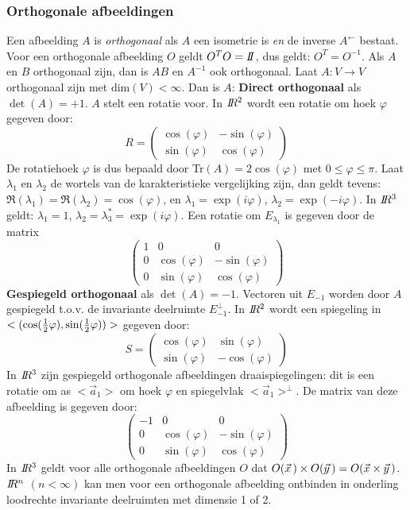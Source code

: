 \documentclass[twoside]{report}
\begin{document}
\subsubsection{Orthogonale afbeeldingen}
Een afbeelding $A$ is {\it orthogonaal} als $A$ een isometrie is {\it en}
de inverse $A^\leftarrow$ bestaat. Voor een orthogonale afbeelding $O$ geldt
$O^TO=I\hspace{-1mm}I$, dus geldt: $O^T=O^{-1}$. Als $A$ en $B$ orthogonaal zijn, dan is
$AB$ en $A^{-1}$ ook orthogonaal.
\npar
Laat $A:V\rightarrow V$ orthogonaal zijn met dim$(V)<\infty$. Dan is $A$:
\npar
{\bf Direct orthogonaal} als $\det(A)=+1$. $A$ stelt een rotatie voor.
In $I\hspace{-1mm}R^2$ wordt een rotatie om hoek $\varphi$ gegeven door:
\[
R=
\left(\begin{array}{cc}
\cos(\varphi)&-\sin(\varphi)\\
\sin(\varphi)&\cos(\varphi)
\end{array}\right)
\]
De rotatiehoek $\varphi$ is dus bepaald door Tr$(A)=2\cos(\varphi)$ met
$0\leq\varphi\leq\pi$. Laat $\lambda_1$ en $\lambda_2$ de wortels van de
karakteristieke vergelijking zijn, dan geldt tevens:
$\Re(\lambda_1)=\Re(\lambda_2)=\cos(\varphi)$, en $\lambda_1=\exp(i\varphi)$,
$\lambda_2=\exp(-i\varphi)$.
\npar
In $I\hspace{-1mm}R^3$ geldt: $\lambda_1=1$, $\lambda_2=\lambda_3^*=\exp(i\varphi)$. Een
rotatie om $E_{\lambda_1}$ is gegeven door de matrix
\[
\left(\begin{array}{ccc}
1&0&0\\
0&\cos(\varphi)&-\sin(\varphi)\\
0&\sin(\varphi)&\cos(\varphi)
\end{array}\right)
\]
{\bf Gespiegeld orthogonaal} als $\det(A)=-1$. Vectoren uit $E_{-1}$ worden door
$A$ gespiegeld t.o.v. de invariante deelruimte $E^\perp_{-1}$. In $I\hspace{-1mm}R^2$ wordt
een spiegeling in $<(\cos(\mbox{$\frac{1}{2}$}\varphi),\sin(\mbox{$\frac{1}{2}$}\varphi))>$ gegeven door:
\[
S=
\left(\begin{array}{cc}
\cos(\varphi)&\sin(\varphi)\\
\sin(\varphi)&-\cos(\varphi)
\end{array}\right)
\]
In $I\hspace{-1mm}R^3$ zijn gespiegeld orthogonale afbeeldingen draaispiegelingen: dit is
een rotatie om as $<\vec{a}_1>$ om hoek $\varphi$ en spiegelvlak
$<\vec{a}_1>^\perp$. De matrix van deze afbeelding is gegeven door:
\[
\left(\begin{array}{ccc}
-1&0&0\\
0&\cos(\varphi)&-\sin(\varphi)\\
0&\sin(\varphi)&\cos(\varphi)
\end{array}\right)
\]
In $I\hspace{-1mm}R^3$ geldt voor alle orthogonale afbeeldingen $O$ dat
$O(\vec{x}\,)\times O(\vec{y}\,)=O(\vec{x}\times\vec{y}\,)$.
\npar
$I\hspace{-1mm}R^n$ $(n<\infty)$ kan men voor een orthogonale afbeelding ontbinden in
onderling loodrechte invariante deelruimten met dimensie 1 of 2.
\end{document}

